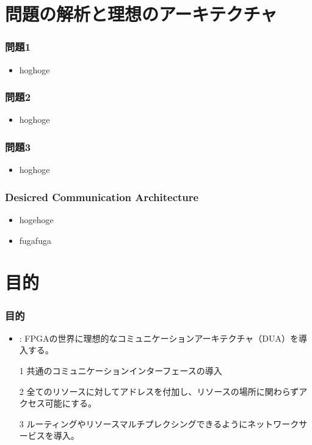 \documentclass[dvipdfmx,9pt,notheorems]{beamer}
\theoremstyle{definition}
\begin{document}
\section{問題の解析と理想のアーキテクチャ}
\begin{frame}\frametitle{問題1}
	\begin{itemize}
		\item hoghoge
	\end{itemize}
	\pnote{
	}
\end{frame}

\begin{frame}\frametitle{問題2}
	\begin{itemize}
		\item hoghoge
	\end{itemize}
	\pnote{
	}
\end{frame}

\begin{frame}\frametitle{問題3}
	\begin{itemize}
		\item hoghoge
	\end{itemize}
	\pnote{
	}
\end{frame}

\begin{frame}\frametitle{Desicred Communication Architecture}
	\begin{itemize}
		\item hogehoge
		\item fugafuga
	\end{itemize}
	\pnote{
	}
\end{frame}


\section{目的}
\begin{frame}\frametitle{目的}
	\begin{itemize}
		\item {} : FPGAの世界に理想的なコミュニケーションアーキテクチャ（DUA）を導入する。
		\item[1] 共通のコミュニケーションインターフェースの導入
		\item[2]  全てのリソースに対してアドレスを付加し、リソースの場所に関わらずアクセス可能にする。
		\item[3]  ルーティングやリソースマルチプレクシングできるようにネットワークサービスを導入。
	\end{itemize}
	\pnote{
	}
\end{frame}
\end{document}
